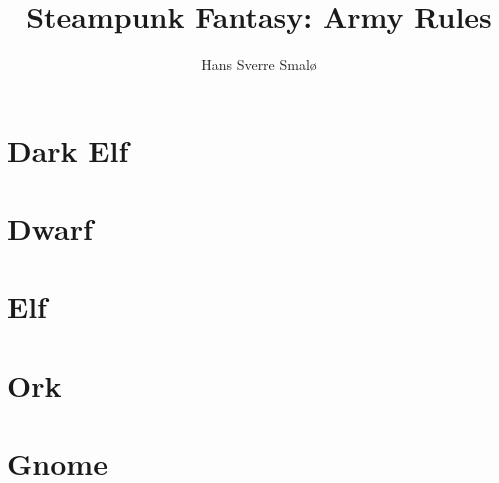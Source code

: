\documentclass[a4,12pt, color, hyperref]{book}
\title{Steampunk Fantasy: Army Rules}
\author{Hans Sverre Smalø}
\begin{document}
\maketitle
\tableofcontents

\chapter{Dark Elf}


\chapter{Dwarf}


\chapter{Elf}


\chapter{Ork}



\chapter{Gnome}

\end{document}
